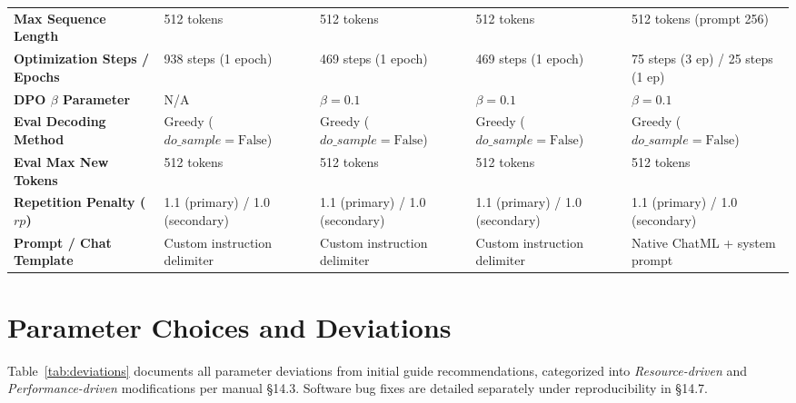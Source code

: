 \documentclass[11pt,a4paper]{article}
\begin{document}
\begin{table}[t]
\begin{tabularx}{\textwidth}{lXXXX}
\textbf{Max Sequence Length} & 512 tokens & 512 tokens & 512 tokens & 512 tokens (prompt 256) \\
\textbf{Optimization Steps / Epochs} & 938 steps (1 epoch) & 469 steps (1 epoch) & 469 steps (1 epoch) & 75 steps (3 ep) / 25 steps (1 ep) \\
\textbf{DPO $\beta$ Parameter} & N/A & $\beta = 0.1$ & $\beta = 0.1$ & $\beta = 0.1$ \\
\midrule
\textbf{Eval Decoding Method} & Greedy ($do\_sample=\text{False}$) & Greedy ($do\_sample=\text{False}$) & Greedy ($do\_sample=\text{False}$) & Greedy ($do\_sample=\text{False}$) \\
\textbf{Eval Max New Tokens} & 512 tokens & 512 tokens & 512 tokens & 512 tokens \\
\textbf{Repetition Penalty ($rp$)} & 1.1 (primary) / 1.0 (secondary) & 1.1 (primary) / 1.0 (secondary) & 1.1 (primary) / 1.0 (secondary) & 1.1 (primary) / 1.0 (secondary) \\
\textbf{Prompt / Chat Template} & Custom instruction delimiter & Custom instruction delimiter & Custom instruction delimiter & Native ChatML + system prompt \\
\bottomrule
\end{tabularx}
\end{table}

\section{Parameter Choices and Deviations}
\label{sec:deviations}

Table~\ref{tab:deviations} documents all parameter deviations from initial guide recommendations, categorized into \textit{Resource-driven} and \textit{Performance-driven} modifications per manual \S14.3. Software bug fixes are detailed separately under reproducibility in \S14.7.
\end{document}

